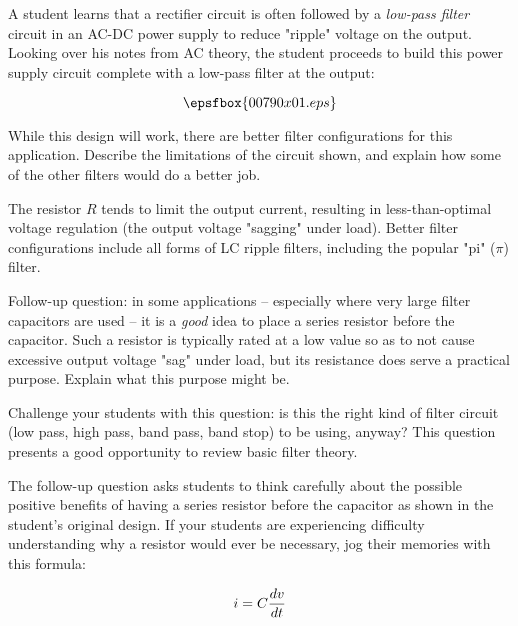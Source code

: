 

A student learns that a rectifier circuit is often followed by a {\it low-pass filter} circuit in an AC-DC power supply to reduce "ripple" voltage on the output.  Looking over his notes from AC theory, the student proceeds to build this power supply circuit complete with a low-pass filter at the output:

$$\epsfbox{00790x01.eps}$$

While this design will work, there are better filter configurations for this application.  Describe the limitations of the circuit shown, and explain how some of the other filters would do a better job.







The resistor $R$ tends to limit the output current, resulting in less-than-optimal voltage regulation (the output voltage "sagging" under load).  Better filter configurations include all forms of LC ripple filters, including the popular "pi" ($\pi$) filter.

\vskip 10pt

Follow-up question: in some applications -- especially where very large filter capacitors are used -- it is a {\it good} idea to place a series resistor before the capacitor.  Such a resistor is typically rated at a low value so as to not cause excessive output voltage "sag" under load, but its resistance does serve a practical purpose.  Explain what this purpose might be.







Challenge your students with this question: is this the right kind of filter circuit (low pass, high pass, band pass, band stop) to be using, anyway?  This question presents a good opportunity to review basic filter theory.

The follow-up question asks students to think carefully about the possible positive benefits of having a series resistor before the capacitor as shown in the student's original design.  If your students are experiencing difficulty understanding why a resistor would ever be necessary, jog their memories with this formula:

$$i = C {dv \over dt}$$





